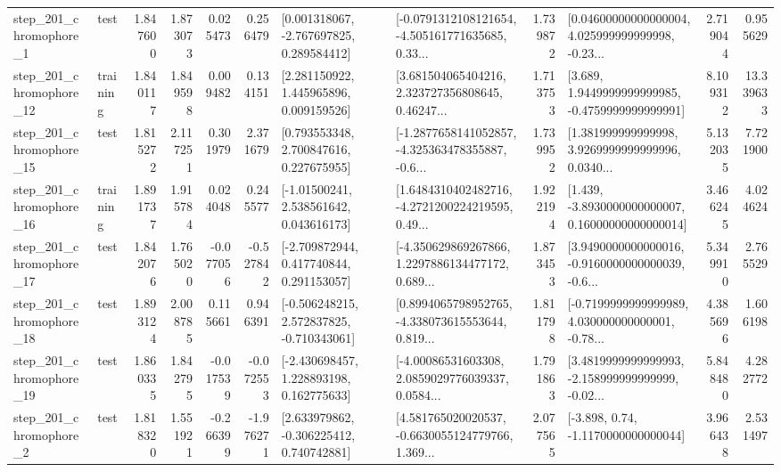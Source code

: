 \begin{tabular}{llrrrrllrlrr}
   step\_201\_chromophore\_1 &      test &      1.847600 &    1.873073 &      0.025473 &  0.256479 &    [0.001318067, -2.767697825, 0.289584412] &  [-0.0791312108121654, -4.505161771635685, 0.33... &       1.739872 &  [0.04600000000000004, 4.025999999999998, -0.23... &            2.719044 &          0.955629 \\
  step\_201\_chromophore\_12 &  training &      1.840117 &    1.849598 &      0.009482 &  0.134151 &     [2.281150922, 1.445965896, 0.009159526] &  [3.681504065404216, 2.323727356808645, 0.46247... &       1.713753 &   [3.689, 1.9449999999999985, -0.4759999999999991] &            8.109312 &         13.339633 \\
  step\_201\_chromophore\_15 &      test &      1.815272 &    2.117251 &      0.301979 &  2.371679 &     [0.793553348, 2.700847616, 0.227675955] &  [-1.2877658141052857, -4.325363478355887, -0.6... &       1.739952 &  [1.381999999999998, 3.9269999999999996, 0.0340... &            5.132035 &          7.721900 \\
  step\_201\_chromophore\_16 &  training &      1.891737 &    1.915784 &      0.024048 &  0.245577 &     [-1.01500241, 2.538561642, 0.043616173] &  [1.6484310402482716, -4.2721200224219595, 0.49... &       1.922194 &  [1.439, -3.8930000000000007, 0.16000000000000014] &            3.466245 &          4.024624 \\
  step\_201\_chromophore\_17 &      test &      1.842076 &    1.765020 &     -0.077056 & -0.527842 &    [-2.709872944, 0.417740844, 0.291153057] &  [-4.350629869267866, 1.2297886134477172, 0.689... &       1.873453 &  [3.9490000000000016, -0.9160000000000039, -0.6... &            5.349910 &          2.765529 \\
  step\_201\_chromophore\_18 &      test &      1.893124 &    2.008785 &      0.115661 &  0.946391 &   [-0.506248215, 2.572837825, -0.710343061] &  [0.8994065798952765, -4.338073615553644, 0.819... &       1.811798 &  [-0.7199999999999989, 4.030000000000001, -0.78... &            4.385696 &          1.606198 \\
  step\_201\_chromophore\_19 &      test &      1.860335 &    1.842795 &     -0.017539 & -0.072553 &    [-2.430698457, 1.228893198, 0.162775633] &  [-4.00086531603308, 2.0859029776039337, 0.0584... &       1.791863 &  [3.4819999999999993, -2.158999999999999, -0.02... &            5.848480 &          4.282772 \\
   step\_201\_chromophore\_2 &      test &      1.818320 &    1.551921 &     -0.266399 & -1.976271 &    [2.633979862, -0.306225412, 0.740742881] &  [4.581765020020537, -0.6630055124779766, 1.369... &       2.077565 &                [-3.898, 0.74, -1.1170000000000044] &            3.966438 &          2.531497 \\

\end{tabular}
